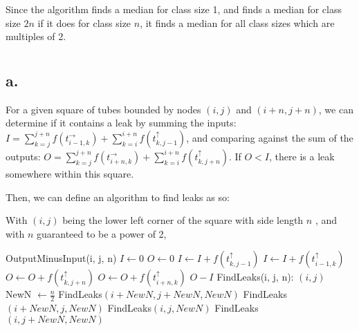 \documentclass[11pt]{article}
\begin{document}
Since the algorithm finds a median for class size 1, and finds a median for class size $2n$ if it does for class size $n$, it finds a median for all class sizes which are multiples of 2.

\pagebreak
\section{}
\subsection*{a.}
For a given square of tubes bounded by nodes $(i, j)$ and $(i+n, j+n)$, we can determine if it contains a leak by summing the inputs: $I = \sum_{k=j}^{j+n} f(t^{\rightarrow}_{i-1,k}) + \sum_{k=i}^{i+n} f(t^{\uparrow}_{k,j-1})$, and comparing against the sum of the outputs: $O = \sum_{k=j}^{j+n} f(t^{\rightarrow}_{i+n,k}) + \sum_{k=i}^{i+n} f(t^{\uparrow}_{k, j+n})$. If $O < I$, there is a leak somewhere within this square.

Then, we can define an algorithm to find leaks as so:

With $(i, j)$ being the lower left corner of the square with side length $n$ , and with $n$ guaranteed to be a power of 2,
\begin{algorithmic}[H]
    \State OutputMinusInput(i, j, n)
        \State $I \gets 0$
        \State $O \gets 0$
            \State $I \gets I + f(t^{\uparrow}_{k, j-1})$
        \EndFor
            \State $I \gets I + f(t^{\uparrow}_{i-1, k})$
        \EndFor
            \State $O \gets O + f(t^{\uparrow}_{k, j+n})$
        \EndFor
            \State $O \gets O + f(t^{\uparrow}_{i+n, k})$
        \EndFor
        \State \Return $O - I$
    \State FindLeaks(i, j, n):
         
            \State \Return $(i, j)$
        \Else
            \State NewN $\gets \frac{n}{2}$
             
                \State \Return FindLeaks$(i + NewN, j + NewN, NewN)$
             
                \State \Return FindLeaks$(i + NewN, j, NewN)$
             
                \State \Return FindLeaks$(i, j, NewN)$
             
                \State \Return FindLeaks$(i, j + NewN, NewN)$
            \EndIf
        \EndIf
\end{algorithmic}
\end{document}
